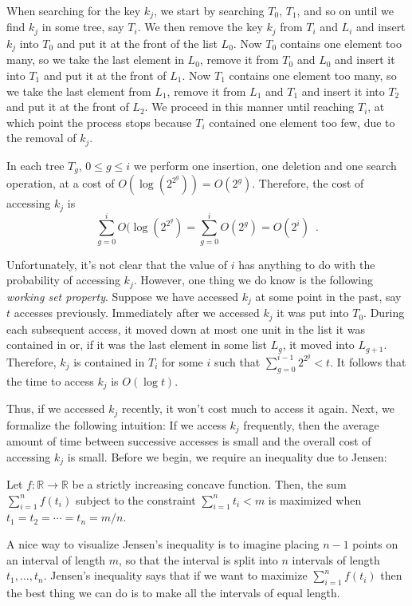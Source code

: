 When searching for the key $k_j$, we start by searching $T_0$, $T_1$,
and so on until we find $k_j$ in some tree, say $T_i$.  We then remove
the key $k_j$ from $T_i$ and $L_i$ and insert $k_j$ into $T_0$ and put
it at the front of the list $L_0$.  Now $T_0$ contains one element too
many, so we take the last element in $L_0$, remove it from $T_0$ and
$L_0$ and insert it into $T_1$ and put it at the front of $L_1$.  Now
$T_1$ contains one element too many, so we take the last element from
$L_1$, remove it from $L_1$ and $T_1$ and insert it into $T_2$ and put
it at the front of $L_2$.  We proceed in this manner until reaching
$T_i$, at which point the process stops because $T_i$ contained one
element too few, due to the removal of $k_j$.

In each tree $T_g$, $0\le g\le i$ we perform one insertion, one
deletion and one search operation, at a cost of
$O(\log(2^{2^g}))=O(2^g)$.  Therefore, the cost of accessing $k_j$ is
\[
\sum_{g=0}^iO(\log(2^{2^g}) = \sum_{g=0}^iO({2^g}) = O(2^i) \enspace .
\]

Unfortunately, it's not clear that the value of $i$ has anything to do
with the probability of accessing $k_j$.  However, one thing we do
know is the following \emph{working set property}.  Suppose we have
accessed $k_j$ at some point in the past, say $t$ accesses previously.
Immediately after we accessed $k_j$ it was put into $T_0$.  During
each subsequent access, it moved down at most one unit in the list it
was contained in or, if it was the last element in some list $L_g$, it
moved into $L_{g+1}$.  Therefore, $k_j$ is contained in $T_i$ for some
$i$ such that $\sum_{g=0}^{i-1} 2^{2^{g}} < t$.  It follows that the
time to access $k_j$ is $O(\log t)$.  

Thus, if we accessed $k_j$ recently, it won't cost much to access it
again.  Next, we formalize the following intuition: If we access $k_j$
frequently, then the average amount of time between successive
accesses is small and the overall cost of accessing $k_j$ is small.
Before we begin, we require an inequality due to Jensen:

\begin{lem}
Let $f:\mathbb{R}\rightarrow\mathbb{R}$ be a strictly increasing
concave function.  Then, the sum $\sum_{i=1}^n f(t_i)$ subject to the
constraint $\sum_{i=1}^n t_i<m$ is maximized when
$t_1=t_2=\cdots=t_n=m/n$.
\end{lem}

A nice way to visualize Jensen's inequality is to imagine placing
$n-1$ points on an interval of length $m$, so that the interval is
split into $n$ intervals of length $t_1,\ldots,t_n$.  Jensen's
inequality says that if we want to maximize $\sum_{i=1}^nf(t_i)$ then
the best thing we can do is to make all the intervals of equal length.

